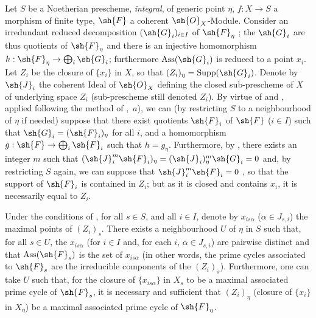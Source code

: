 \medskip
\noindent
\emph{}
\label{IV.9.8.2}
Let $S$ be a Noetherian prescheme, \emph{integral}, of generic point $\eta$, $f:X\to S$ a morphism of finite type, $\sh{F}$ a coherent $\sh{O}_X$-Module.
Consider an irredundant reduced decomposition $(\sh{G}_i)_{i\in I}$ of $\sh{F}_\eta$ ; the $\sh{G}_i$ are thus quotients of $\sh{F}_\eta$ and there is an injective homomorphism $h:\sh{F}_\eta\to\bigoplus_i\sh{G}_i$; furthermore $\operatorname{Ass}(\sh{G}_i)$ is reduced to a point $x_i$.
Let $Z_i$ be the closure of $\{x_i\}$ in $X$, so that $(Z_i)_\eta=\operatorname{Supp}(\sh{G}_i)$.
Denote by $\sh{J}_i$ the coherent Ideal of $\sh{O}_X$ defining the closed sub-prescheme of $X$ of underlying space $Z_i$ (sub-prescheme still denoted $Z_i$).
By virtue of  and , applied following the method of ,~$a$), we can (by restricting $S$ to a neighbourhood of $\eta$ if needed) suppose that there exist quotients $\sh{F}_i$ of $\sh{F}$ ($i\in I$) such that $\sh{G}_i=(\sh{F}_i)_\eta$ for all $i$, and a homomorphism $g:\sh{F}\to\bigoplus_i\sh{F}_i$ such that $h=g_\eta$.
Furthermore, by , there exists an integer $m$ such that $(\sh{J}_i^m\sh{F}_i)_\eta=(\sh{J}_i)_\eta^m\sh{G}_i=0$ and, by restricting $S$ again, we can suppose that $\sh{J}_i^m\sh{F}_i=0$ , so that the support of $\sh{F}_i$ is contained in $Z_i$; but as it is closed and contains $x_i$, it is necessarily equal to $Z_i$.

\begin{proposition}[9.8.3]
\label{IV.9.8.3}
Under the conditions of \emph{}, for all $s\in S$, and all $i\in I$, denote by $x_{is\alpha}$ ($\alpha\in J_{s,i}$) the maximal points of $(Z_i)_s$.
There exists a neighbourhood $U$ of $\eta$ in $S$ such that, for all $s\in U$, the $x_{is\alpha}$ (for $i\in I$ and, for each $i$, $\alpha\in J_{s,i}$) are pairwise distinct and that $\operatorname{Ass}(\sh{F}_s)$ is the set of $x_{is\alpha}$ (in other words, the prime cycles associated to $\sh{F}_s$ are the irreducible components of the $(Z_i)_s$).
Furthermore, one can take $U$ such that, for the closure of $\{x_{is\alpha}\}$ in $X_s$ to be a maximal associated prime cycle of $\sh{F}_s$, it is necessary and sufficient that $(Z_i)_\eta$ (closure of $\{x_i\}$ in $X_\eta$) be a maximal associated prime cycle of $\sh{F}_\eta$.
\end{proposition}

